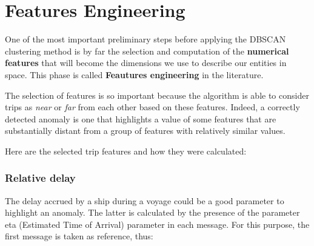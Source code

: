 \clearpage

\section{Features Engineering}
\label{sec:features}
    One of the most important preliminary steps before applying the DBSCAN clustering method is by far the selection and computation of the \textbf{numerical features} that will become the dimensions we use to describe our entities in space. This phase is called \textbf{Feautures engineering} in the literature. 
     
    The selection of features is so important because the algorithm is able to consider trips as \textit{near} or \textit{far} from each other based on these features. Indeed, a correctly detected anomaly is one that highlights a value of some features that are substantially distant from a group of features with relatively similar values.
    
    Here are the selected trip features and how they were calculated:
    
    
    
    \subsubsection{Relative delay}
    
        The delay accrued by a ship during a voyage could be a good parameter to highlight an anomaly. The latter is calculated by the presence of the parameter eta (Estimated Time of Arrival) parameter in each message. For this purpose, the first message is taken as reference, thus:
        
